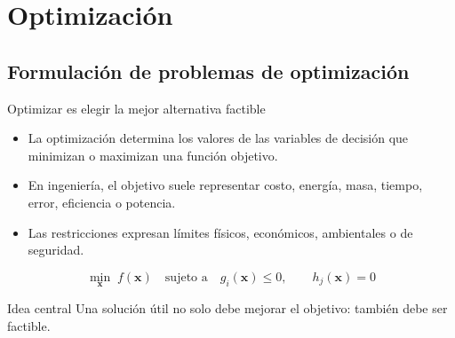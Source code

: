 \documentclass[../../main.tex]{subfiles}
\begin{document}
\section{Optimización}


\subsection{Formulación de problemas de optimización}

\begin{frame}{Optimizar es elegir la mejor alternativa factible}
\begin{itemize}
  \item La optimización determina los valores de las variables de decisión que minimizan o maximizan una función objetivo.
  \item En ingeniería, el objetivo suele representar costo, energía, masa, tiempo, error, eficiencia o potencia.
  \item Las restricciones expresan límites físicos, económicos, ambientales o de seguridad.
\end{itemize}

\[
\boxed{
\min_{\mathbf{x}}\; f(\mathbf{x})
\quad \text{sujeto a} \quad
g_i(\mathbf{x})\le 0,
\qquad
h_j(\mathbf{x})=0
}
\]

\begin{block}{Idea central}
Una solución útil no solo debe mejorar el objetivo: también debe ser factible.
\end{block}
\end{frame}
\end{document}
